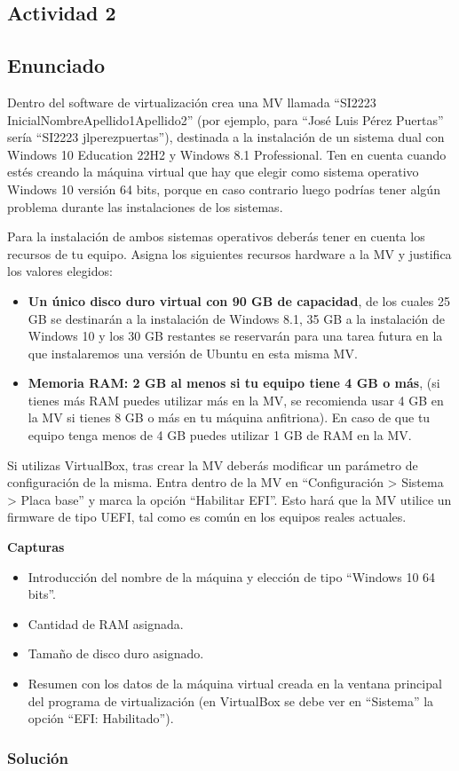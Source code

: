 \subsection{Actividad 2}

\subsection{Enunciado}
Dentro del software de virtualización crea una MV llamada ``SI2223 InicialNombreApellido1Apellido2'' (por ejemplo, para ``José Luis Pérez Puertas'' sería ``SI2223 jlperezpuertas''), destinada a la instalación de un sistema dual con Windows 10 Education 22H2 y Windows 8.1 Professional. Ten en cuenta cuando estés creando la máquina virtual que hay que elegir como sistema operativo Windows 10 versión 64 bits, porque en caso contrario luego podrías tener algún problema durante las instalaciones de los sistemas.

Para la instalación de ambos sistemas operativos deberás tener en cuenta los recursos de tu equipo. Asigna los siguientes recursos hardware a la MV y justifica los valores elegidos:

\begin{itemize}
    \item \textbf{Un único disco duro virtual con 90 GB de capacidad}, de los cuales 25 GB se destinarán a la instalación de Windows 8.1, 35 GB a la instalación de Windows 10 y los 30 GB restantes se reservarán para una tarea futura en la que instalaremos una versión de Ubuntu en esta misma MV.

    \item \textbf{Memoria RAM: 2 GB al menos si tu equipo tiene 4 GB o más}, (si tienes más RAM puedes utilizar más en la MV, se recomienda usar 4 GB en la MV si tienes 8 GB o más en tu máquina anfitriona). En caso de que tu equipo tenga menos de 4 GB puedes utilizar 1 GB de RAM en la MV.
\end{itemize}


Si utilizas VirtualBox, tras crear la MV deberás modificar un parámetro de configuración de la misma. Entra dentro de la MV en ``Configuración > Sistema > Placa base'' y marca la opción ``Habilitar EFI''. Esto hará que la MV utilice un firmware de tipo UEFI, tal como es común en los equipos reales actuales.

\textbf{Capturas}

\begin{itemize}
    \item Introducción del nombre de la máquina y elección de tipo ``Windows 10 64 bits''.
    \item Cantidad de RAM asignada.
    \item Tamaño de disco duro asignado.
    \item Resumen con los datos de la máquina virtual creada en la ventana principal del programa de virtualización (en VirtualBox se debe ver en ``Sistema'' la opción ``EFI: Habilitado'').
\end{itemize}

\subsubsection{Solución}







\newpage



